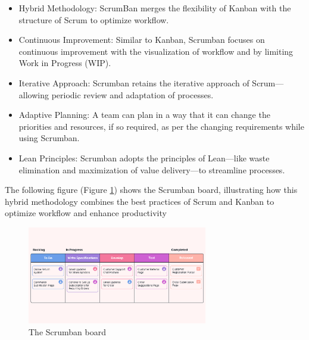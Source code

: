 \begin{itemize}
    \item Hybrid Methodology: ScrumBan merges the flexibility of Kanban with the structure of Scrum to optimize workflow.
    \item Continuous Improvement: Similar to Kanban, Scrumban focuses on continuous improvement with the visualization of workflow and by limiting Work in Progress (WIP).
    \item Iterative Approach: Scrumban retains the iterative approach of Scrum—allowing periodic review and adaptation of processes.
    \item Adaptive Planning: A team can plan in a way that it can change the priorities and resources, if so required, as per the changing requirements while using Scrumban.
    \item Lean Principles: Scrumban adopts the principles of Lean—like waste elimination and maximization of value delivery—to streamline processes.
\end{itemize}
The following figure (Figure \ref{fig:Scrumban_image}) shows the Scrumban board, illustrating how this hybrid methodology combines the best practices of Scrum and Kanban to optimize workflow and enhance productivity
\begin{figure}[H]
    \centering
    \includegraphics[width=0.7\textwidth]{src/assets/chapters/Scrumban.png}
    \caption{The Scrumban board}
    \label{fig:Scrumban_image}
\end{figure}

